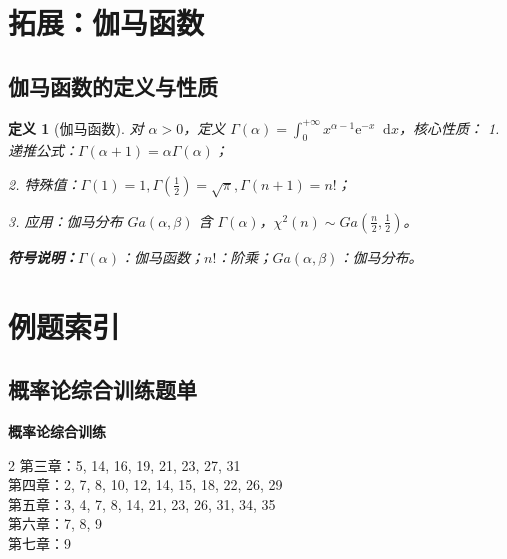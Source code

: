 \documentclass[11pt,a4paper,oneside]{article}
\theoremstyle{yhbthm}
\newtheorem{definition}{定义}[section]
\newcommand{\dif}{\mathop{}\!\mathrm{d}}
\newcommand{\e}{\mathrm{e}}
\newcommand{\symnote}[1]{\par\noindent\textbf{符号说明：}#1\par}
\begin{document}
\section{拓展：伽马函数}
\subsection{伽马函数的定义与性质}
\begin{definition}[伽马函数]
对 $\alpha > 0$，定义 $\Gamma(\alpha) = \int_{0}^{+\infty} x^{\alpha-1} \e^{-x} \dif x$，核心性质：
1. 递推公式：$\Gamma(\alpha+1) = \alpha \Gamma(\alpha)$；

2. 特殊值：$\Gamma(1)=1, \Gamma\left(\frac{1}{2}\right)=\sqrt{\pi}, \Gamma(n+1)=n!$；

3. 应用：伽马分布 $Ga(\alpha,\beta)$ 含 $\Gamma(\alpha)$，$\chi^2(n) \sim Ga\left(\frac{n}{2},\frac{1}{2}\right)$。
\symnote{$\Gamma(\alpha)$：伽马函数；$n!$：阶乘；$Ga(\alpha,\beta)$：伽马分布。}
\end{definition}

\section{例题索引}
\subsection{概率论综合训练题单}
\noindent \textbf{概率论综合训练}
\begin{multicols}{2}
\RaggedRight
第三章：5, 14, 16, 19, 21, 23, 27, 31 \\
第四章：2, 7, 8, 10, 12, 14, 15, 18, 22, 26, 29 \\
第五章：3, 4, 7, 8, 14, 21, 23, 26, 31, 34, 35 \\
第六章：7, 8, 9 \\
第七章：9
\end{multicols}
\end{document}
